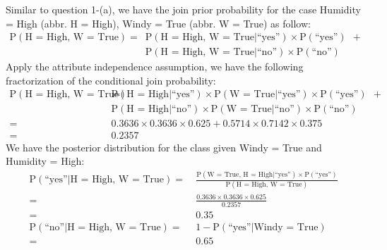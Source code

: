 \documentclass[12pt,twoside]{article}
\begin{document}
\begin{exercises}
\begin{exerciseparts}
  \ifsolution \solution{}
    Similar to question 1-(a), we have the join prior probability
    for the case Humidity = High (abbr. H = High), Windy = True
    (abbr. W = True) as follow:
    \begin{equation*}
      \begin{aligned}
        \mbox{P}(\mbox{H = High, W = True}) 
          = \ & \mbox{P}(\mbox{H = High, W = True}|\mbox{``yes''})  \times \mbox{P}(\mbox{``yes''})\ \ + \\
            & \mbox{P}(\mbox{H = High, W = True}|\mbox{``no''})  \times \mbox{P}(\mbox{``no''})
      \end{aligned}
    \end{equation*}
    Apply the attribute independence assumption, we have the following
    fractorization of the conditional join probability:
    \begin{equation*}
      \begin{aligned}
        \mbox{P}(\mbox{H = High, W = True}) 
          = \ & \mbox{P}(\mbox{H = High}|\mbox{``yes''}) \times 
                \mbox{P}(\mbox{W = True}|\mbox{``yes''}) \times \mbox{P}(\mbox{``yes''})\ \ + \\
              & \mbox{P}(\mbox{H = High}|\mbox{``no''}) \times
                \mbox{P}(\mbox{W = True}|\mbox{``no''}) \times \mbox{P}(\mbox{``no''}) \\
          = \ & 0.3636 \times 0.3636 \times 0.625 + 0.5714 \times 0.7142 \times 0.375 \\
          = \ & 0.2357
      \end{aligned}
    \end{equation*}
    We have the posterior distribution for the class given Windy = True and Humidity = High:
    \begin{equation*}
      \begin{aligned}
        \mbox{P}(\mbox{``yes''} | \mbox{H = High, W = True}) 
        = & \ \frac{\mbox{P}(\mbox{W = True, H = High} | \mbox{``yes''}) \times
        \mbox{P}(\mbox{``yes''})}{\mbox{P}(\mbox{H = High, W = True})} \\
        = & \ \frac{0.3636 \times 0.3636 \times 0.625}{0.2357} \\
        = & \ \boldsymbol{0.35} \\
        \mbox{P}(\mbox{``no''} | \mbox{H = High, W = True}) 
        = & \ 1 - \mbox{P}(\mbox{``yes''} | \mbox{Windy = True})  \\
        = & \ \boldsymbol{0.65}
      \end{aligned}
    \end{equation*}
  \fi 


\end{exerciseparts}
\end{exercises}
\end{document}
